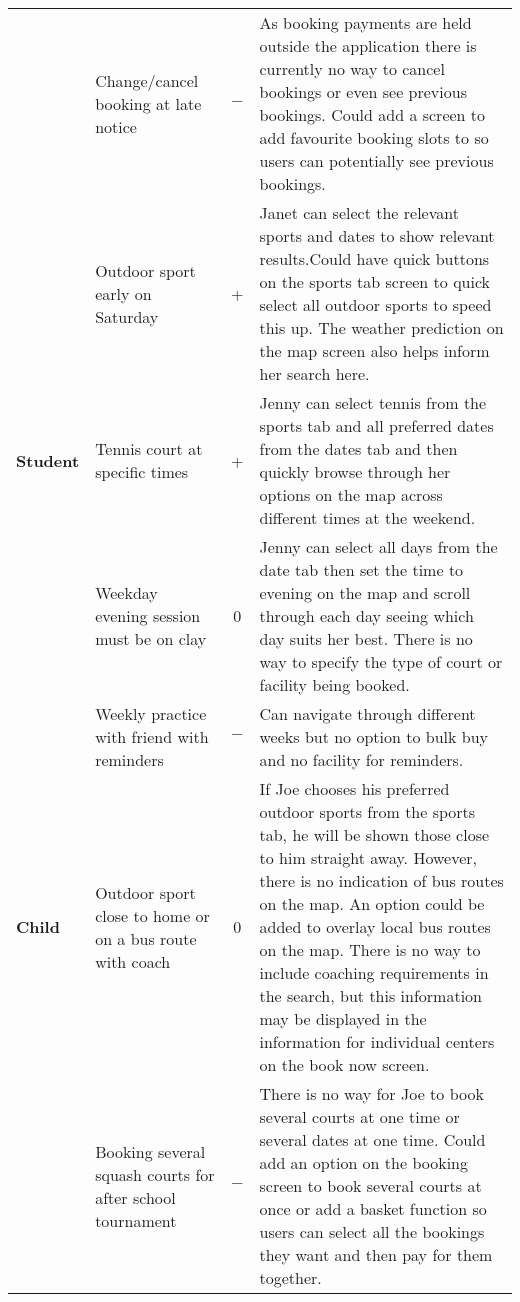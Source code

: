 \begin{center}
\begin{longtable}{p{} p{} c p{}}
		& Change/cancel booking at late notice & $-$ & As booking payments are
		held outside the application there is currently no way to cancel
		bookings or even see previous bookings. Could add a screen to add
		favourite booking slots to so users can potentially see previous
		bookings.\\

		& Outdoor sport early on Saturday & + & Janet can select the relevant
		sports and dates to show relevant results.Could have quick buttons on
		the sports tab screen to quick select all outdoor sports to speed this
		up. The weather prediction on the map screen also helps inform her
		search here.\\

		\midrule
		\textbf{Student} & Tennis court at specific times & + & Jenny can
		select tennis from the sports tab and all preferred dates from the
		dates tab and then quickly browse through her options on the map across
		different times at the weekend.\\

		& Weekday evening session must be on clay & 0 & Jenny can select all
		days from the date tab then set the time to evening on the map and
		scroll through each day seeing which day suits her best. There is no
		way to specify the type of court or facility being booked.\\

		& Weekly practice with friend with reminders & $-$ & Can navigate
		through different weeks but no option to bulk buy and no facility for
		reminders.\\

		\midrule
		\textbf{Child} & Outdoor sport close to home or on a bus route with
		coach & 0 & If Joe chooses his preferred outdoor sports from the sports
		tab, he will be shown those close to him straight away. However, there
		is no indication of bus routes on the map. An option could be added to
		overlay local bus routes on the map. There is no way to include
		coaching requirements in the search, but this information may be
		displayed in the information for individual centers on the book now
		screen.\\

		& Booking several squash courts for after school tournament & $-$ &
		There is no way for Joe to book several courts at one time or several
		dates at one time. Could add an option on the booking screen to book
		several courts at once or add a basket function so users can select all
		the bookings they want and then pay for them together.


\end{longtable}
\end{center}
